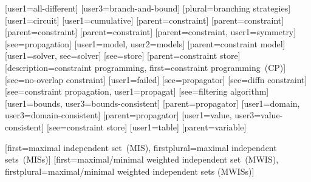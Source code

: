 [user1={all-different}]
[user3={branch-and-bound}]
[plural={branching strategies}]
[user1={circuit}]
[user1={cumulative}]
[parent={constraint}]
[parent={constraint}]
[parent={constraint}]
[parent={constraint}]
%
        [parent={constraint}, user1={symmetry}]
[see={propagation}]
[user1={model}, user2={models}]
[parent={constraint model}]
[user1={solver}, see={solver}]
[see={store}]
[parent={constraint store}]
%
        [description={constraint programming},
         first={constraint programming~(CP)}]
[see={no-overlap constraint}]
[user1={failed}]
[see={propagator}]
[see={diffn constraint}]
[see={constraint propagation}, user1={propagat}]
[see={filtering algorithm}]
[user1={bounds}, user3={bounds-consistent}]
[parent={propagator}]
[user1={domain}, user3={domain-consistent}]
[parent={propagator}]
[user1={value}, user3={value-consistent}]
[see={constraint store}]
[user1={table}]
[parent={variable}]




%
        [first={maximal independent set~(MIS)},
         firstplural={maximal independent sets~(MISs)}]
%
        [first={maximal/minimal weighted independent set~(MWIS)},
         firstplural={maximal/minimal weighted independent sets (MWISs)}]

